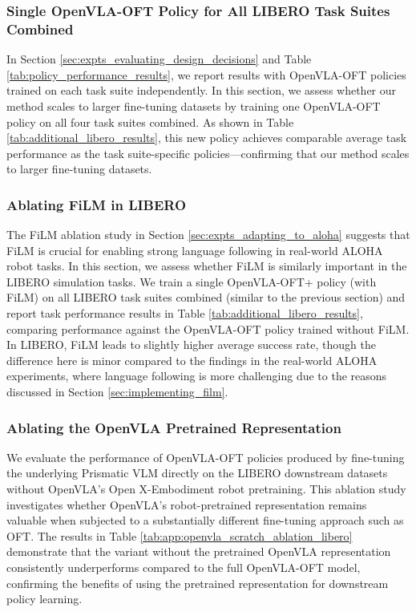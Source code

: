 \documentclass[conference]{IEEEtran}
\begin{document}
\subsubsection{Single OpenVLA-OFT Policy for All LIBERO Task Suites Combined}
\label{app:single_policy_all_libero}

In Section \ref{sec:expts_evaluating_design_decisions} and Table \ref{tab:policy_performance_results}, we report results with OpenVLA-OFT policies trained on each task suite independently. In this section, we assess whether our method scales to larger fine-tuning datasets by training one OpenVLA-OFT policy on all four task suites combined. As shown in Table \ref{tab:additional_libero_results}, this new policy achieves comparable average task performance as the task suite-specific policies---confirming that our method scales to larger fine-tuning datasets.

\subsubsection{Ablating FiLM in LIBERO}
\label{app:ablating_film_libero}

The FiLM ablation study in Section \ref{sec:expts_adapting_to_aloha} suggests that FiLM is crucial for enabling strong language following in real-world ALOHA robot tasks. In this section, we assess whether FiLM is similarly important in the LIBERO simulation tasks. We train a single OpenVLA-OFT+ policy (with FiLM) on all LIBERO task suites combined (similar to the previous section) and report task performance results in Table \ref{tab:additional_libero_results}, comparing performance against the OpenVLA-OFT policy trained without FiLM. In LIBERO, FiLM leads to slightly higher average success rate, though the difference here is minor compared to the findings in the real-world ALOHA experiments, where language following is more challenging due to the reasons discussed in Section \ref{sec:implementing_film}.

\subsubsection{Ablating the OpenVLA Pretrained Representation}

We evaluate the performance of OpenVLA-OFT policies produced by fine-tuning the underlying Prismatic VLM \citep{karamcheti2024prismatic} directly on the LIBERO downstream datasets without OpenVLA's Open X-Embodiment \citep{o2023open} robot pretraining. This ablation study investigates whether OpenVLA's robot-pretrained representation remains valuable when subjected to a substantially different fine-tuning approach such as OFT. The results in Table \ref{tab:app:openvla_scratch_ablation_libero} demonstrate that the variant without the pretrained OpenVLA representation consistently underperforms compared to the full OpenVLA-OFT model, confirming the benefits of using the pretrained representation for downstream policy learning.
\end{document}
